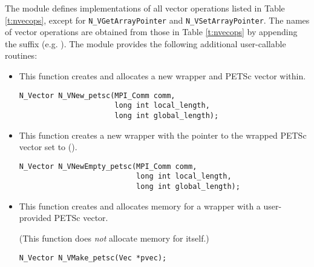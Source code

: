 The {\nvecpetsc} module defines implementations of all vector operations listed 
in Table \ref{t:nvecops}, except for \verb|N_VGetArrayPointer| and 
\verb|N_VSetArrayPointer|. The names of vector operations are obtained from those in 
Table \ref{t:nvecops} by appending the suffix  (e.g. ).
The module {\nvecpetsc}  provides the following additional user-callable routines:
\begin{itemize}


\item  {}
  
  This function creates and allocates a new {\nvector} wrapper and PETSc 
  vector within.
 
  

\begin{verbatim}
N_Vector N_VNew_petsc(MPI_Comm comm, 
                      long int local_length, 
                      long int global_length);
\end{verbatim}
  

\item {}
 
  This function creates a new {\nvector} wrapper with the pointer to
  the wrapped PETSc vector set to ().
 
  

\begin{verbatim}
N_Vector N_VNewEmpty_petsc(MPI_Comm comm, 
                           long int local_length, 
                           long int global_length);
\end{verbatim}

  

\item {}
  
  This function creates and allocates memory for a {\nvecpetsc}
  wrapper with a user-provided PETSc vector.
 
  (This function does {\em not} allocate memory for  itself.)

\begin{verbatim}
N_Vector N_VMake_petsc(Vec *pvec);
\end{verbatim}




\end{itemize}
